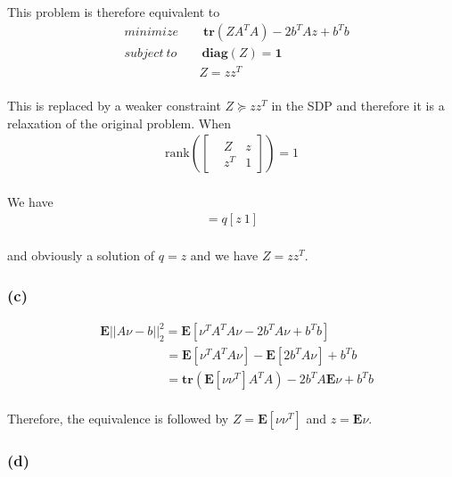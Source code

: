 \paragraph{}
This problem is therefore equivalent to
\begin{align*}
&minimize \qquad \textbf{tr}(ZA^TA)-2b^TAz + b^Tb\\
&subject\ to \qquad \textbf{diag}(Z)=\textbf{1}\\
&\qquad \qquad \qquad Z=zz^T
\end{align*}
\paragraph{}
This is replaced by a weaker constraint $Z\succeq zz^T$ in the SDP and therefore it is a relaxation of the original problem. When
\begin{align*}
\text{rank}( \begin{bmatrix}
&Z&z\\&z^T&1
\end{bmatrix}) = 1
\end{align*}
\paragraph{}
We have
\begin{align*}
[Z\ z] = q[z\ 1]
\end{align*}
\paragraph{}
and obviously a solution of $q = z$ and we have $Z=zz^T$.
\subsubsection*{(c)}
\begin{align*}
&\textbf{E}||A\nu-b||^2_2 =\textbf{E}[\nu^TA^TA\nu -2b^TA\nu+b^Tb]\\
&\qquad \qquad \quad \ =\textbf{E}[\nu^TA^TA\nu]- \textbf{E}[2b^TA\nu] +b^Tb\\
&\qquad \qquad \quad \ =\textbf{tr}(\textbf{E}[\nu\nu^T]A^TA)-2b^TA\textbf{E}\nu+b^Tb
\end{align*}
\paragraph{}
Therefore, the equivalence is followed by $Z = \textbf{E}[\nu\nu^T]$ and $z = \textbf{E}\nu$.
\subsubsection*{(d)}
